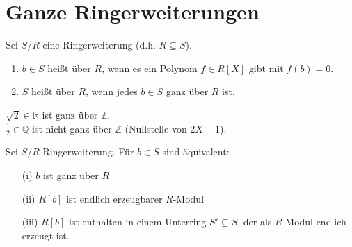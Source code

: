 \section{Ganze Ringerweiterungen}

\begin{Def} 
  Sei $S/R$ eine Ringerweiterung (d.h. $R \subseteq S$).
  \begin{enumerate} 
    \item $b \in S$ heißt  über $R$, wenn es ein 
          Polynom $f \in R[X]$ gibt mit $f(b) = 0$.
    \item $S$ heißt  über $R$, wenn jedes
    $b \in S$ ganz über $R$ ist.
\end{enumerate}
\end{Def}

\begin{nnBsp} 
  $\sqrt{2} \in \mathbb{R}$ ist ganz über $\mathbb{Z}$.\\
  $\frac{1}{2} \in \mathbb{Q}$ ist nicht ganz über $\mathbb{Z}$ (Nullstelle von
  $2X -1$).
\end{nnBsp}

\begin{Prop}
\label{2.7}
  Sei $S/R$ Ringerweiterung. Für $b \in S$ sind äquivalent:
  \begin{enumerate} 
    \item[(i)] $b$ ist ganz über $R$
    \item[(ii)] $R[b]$ ist endlich erzeugbarer $R$-Modul
    \item[(iii)] $R[b]$ ist enthalten in einem Unterring $S' \subseteq S$, der
                 als $R$-Modul endlich erzeugt ist.
\end{enumerate}
\end{Prop}

